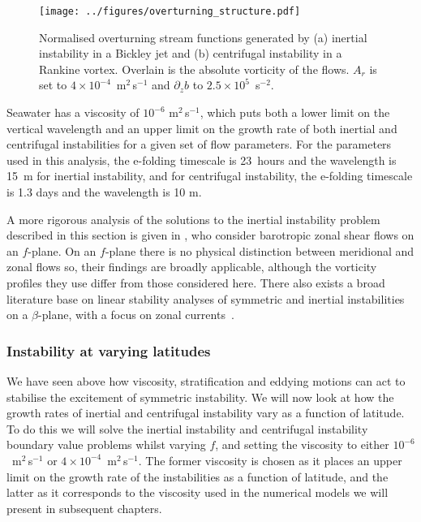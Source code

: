 \begin{figure}[t]
    \centering
    \texttt{[image: ../figures/overturning\_structure.pdf]}
    \caption{Normalised overturning stream functions generated by (a) inertial instability in a Bickley jet and (b) centrifugal instability in a Rankine vortex. Overlain is the absolute vorticity of the flows. $A_r$ is set to $4 \times 10^{-4}$~m$^2\,$s$^{-1}$ and $\partial_z b$ to $2.5 \times 10^5$~s$^{-2}$.}
    \label{fig:2DStructure}
\end{figure}

Seawater has a viscosity of $10^{-6}$ m$^{2}$\,s$^{-1}$, which puts both a lower limit on the vertical wavelength and an upper limit on the growth rate of both inertial and centrifugal instabilities for a given set of flow parameters. For the parameters used in this analysis, the e-folding timescale is 23~hours and the wavelength is 15~m for inertial instability, and for centrifugal instability, the e-folding timescale is 1.3 days and the wavelength is 10 m. 

A more rigorous analysis of the solutions to the inertial instability problem described in this section is given in \citet{Plougonven2009}, who consider barotropic zonal shear flows on an $f$-plane. On an $f$-plane there is no physical distinction between meridional and zonal flows so, their findings are broadly applicable, although the vorticity profiles they use differ from those considered here. There also exists a broad literature base on linear stability analyses of symmetric and inertial instabilities on a $\beta$-plane, with a focus on zonal currents~\citep[e.g.][]{Hua1997, Griffiths2003, Ribstein2014, Kloosterziel2017}.

\subsubsection{Instability at varying latitudes}
We have seen above how viscosity, stratification and eddying motions can act to stabilise the excitement of symmetric instability. We will now look at how the growth rates of inertial and centrifugal instability vary as a function of latitude. To do this we will solve the inertial instability and centrifugal instability boundary value problems whilst varying $f$, and setting the viscosity to either $10^{-6}$~m$^{2}\,$s$^{-1}$ or $4 \times 10^{-4}$~m$^{2}\,$s$^{-1}$. The former viscosity is chosen as it places an upper limit on the growth rate of the instabilities as a function of latitude, and the latter as it corresponds to the viscosity used in the numerical models we will present in subsequent chapters.

